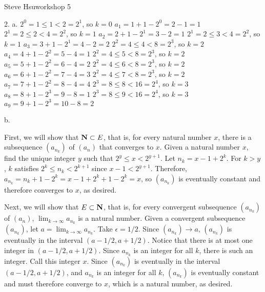 \def\natural{{\bf N}}
\centerline{Steve Hsu\hfill workshop 5}
\item{2.} a.
 $2^0 = 1 \le 1 < 2 = 2^1$, so $k = 0$
\itemitem{} $a_1 = 1 + 1 - 2^0 = 2 - 1 = 1$
 $2^1 = 2 \le 2 < 4 = 2^2$, so $k = 1$
\itemitem{} $a_2 = 2 + 1 - 2^1 = 3 - 2 = 1$
 $2^1 = 2 \le 3 < 4 = 2^2$, so $k = 1$
\itemitem{} $a_3 = 3 + 1 - 2^1 = 4 - 2 = 2$
 $2^2 = 4 \le 4 < 8 = 2^3$, so $k = 2$
\itemitem{} $a_4 = 4 + 1 - 2^2 = 5 - 4 = 1$
 $2^2 = 4 \le 5 < 8 = 2^3$, so $k = 2$
\itemitem{} $a_5 = 5 + 1 - 2^2 = 6 - 4 = 2$
 $2^2 = 4 \le 6 < 8 = 2^3$, so $k = 2$
\itemitem{} $a_6 = 6 + 1 - 2^2 = 7 - 4 = 3$
 $2^2 = 4 \le 7 < 8 = 2^3$, so $k = 2$
\itemitem{} $a_7 = 7 + 1 - 2^2 = 8 - 4 = 4$
 $2^3 = 8 \le 8 < 16 = 2^4$, so $k = 3$
\itemitem{} $a_8 = 8 + 1 - 2^3 = 9 - 8 = 1$
 $2^3 = 8 \le 9 < 16 = 2^4$, so $k = 3$
\itemitem{} $a_9 = 9 + 1 - 2^3 = 10 - 8 = 2$
\medskip
\item{} b.

First, we will show that $\natural \subset E$,
that is, for every natural number $x$,
there is a subsequence $(a_{n_k})$ of $(a_n)$
that converges to $x$.
Given a natural number $x$,
find the unique integer $y$ such that $2^y \le x < 2^{y + 1}$.
Let $n_k = x - 1 + 2^k$.
For $k > y$, $k$ satisfies $2^k \le n_k < 2^{k + 1}$
since $x - 1 < 2^{y + 1}$.
Therefore, $a_{n_k} = n_k + 1 - 2^k = x - 1 + 2^k + 1 - 2^k = x$,
so $(a_{n_k})$ is eventually constant and therefore converges to $x$, as desired.

Next, we will show that $E \subset \natural$,
that is, for every convergent subsequence $(a_{n_k})$ of $(a_n)$,
$\lim _{k \to \infty} a_{n_k}$ is a natural number.
Given a convergent subsequence $(a_{n_k})$, let $a = \lim _{k \to \infty} a_{n_k}$.
Take $\epsilon = 1/2$.
Since $(a_{n_k}) \to a$, $(a_{n_k})$ is eventually in the interval
$(a - 1/2, a + 1/2)$.
Notice that there is at most one integer in $(a - 1/2, a + 1/2)$.
Since $a_{n_k}$ is an integer for all $k$,
there is such an integer.
Call this integer $x$.
Since $(a_{n_k})$ is eventually in the interval $(a - 1/2, a + 1/2)$,
and $a_{n_k}$ is an integer for all $k$,
$(a_{n_k})$ is eventually constant and must therefore converge to $x$,
which is a natural number, as desired.
\bye
